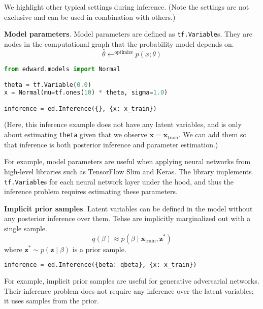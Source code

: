 We highlight other typical settings during inference. (Note the settings are not exclusive and can be used in combination with others.)

\textbf{Model parameters}.
Model parameters are defined as \texttt{tf.Variable}s. They are
nodes in the computational graph that the probability model
depends on.
\begin{equation*}
\hat{\theta} \leftarrow^{\text{optimize}}
p(x; \theta)
\end{equation*}

\begin{lstlisting}[language=Python]
from edward.models import Normal

theta = tf.Variable(0.0)
x = Normal(mu=tf.ones(10) * theta, sigma=1.0)

inference = ed.Inference({}, {x: x_train})
\end{lstlisting}
(Here, this inference example does not have any latent variables, and
is only about estimating \texttt{theta} given that we observe
$\mathbf{x} = \mathbf{x}_{\text{train}}$. We can add them so that
inference is both posterior inference and parameter estimation.)

For example, model parameters are useful when applying neural networks
from high-level libraries such as TensorFlow Slim and Keras. The library
implements \texttt{tf.Variable}s  for each neural network layer under
the hood, and thus the inference problem requires estimating these
parameters.

\textbf{Implicit prior samples}.
Latent variables can be defined in the model without any posterior
inference over them.
Tehse are implicitly marginalized out with a single sample.
\begin{equation*}
q(\beta)\approx
p(\beta\mid\mathbf{x}_{\text{train}}, \mathbf{z}^*)
\end{equation*}
where $\mathbf{z}^*\sim p(\mathbf{z}\mid\beta)$ is a prior sample.

\begin{lstlisting}[language=Python]
inference = ed.Inference({beta: qbeta}, {x: x_train})
\end{lstlisting}

For example, implicit prior samples are useful for generative adversarial
networks. Their inference problem does not require any inference over
the latent variables; it uses samples from the prior.
